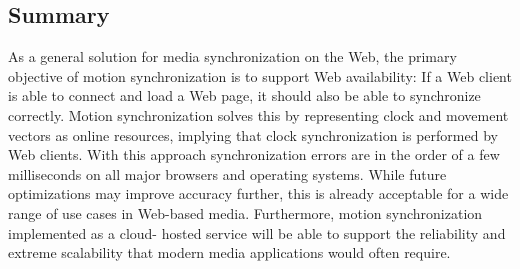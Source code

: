 \subsection{Summary}

As a general solution for media synchronization on the Web, the primary
objective of motion synchronization is to support Web availability: If a Web
client is able to connect and load a Web page, it should also be able to
synchronize correctly. Motion synchronization solves this by representing
clock and movement vectors as online resources, implying that clock
synchronization is performed by Web clients. With this approach
synchronization errors are in the order of a few milliseconds on all major
browsers and operating systems. While future optimizations may improve
accuracy further, this is already acceptable for a wide range of use cases in
Web-based media. Furthermore, motion synchronization implemented as a cloud-
hosted service will be able to support the reliability and extreme scalability
that modern media applications would often require.
